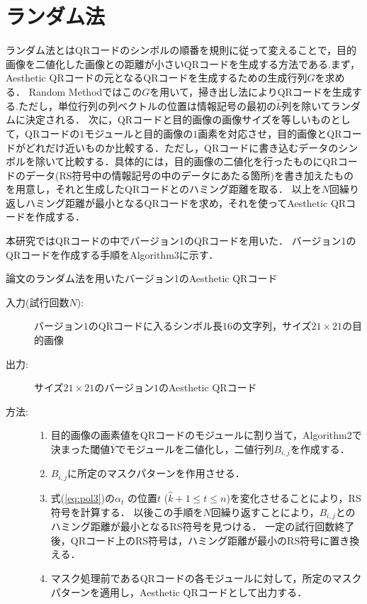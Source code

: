 \documentclass{thesis}
\begin{document}
\newpage
\section{ランダム法}

ランダム法とはQRコードのシンボルの順番を規則に従って変えることで，目的画像を二値化した画像との距離が小さいQRコードを生成する方法である.まず，Aesthetic QRコードの元となるQRコードを生成するための生成行列$G$を求める．
Random Methodではこの$G$を用いて，掃き出し法によりQRコードを生成する.ただし，単位行列の列ベクトルの位置は情報記号の最初の$\hat{k}$列を除いてランダムに決定される．
次に，QRコードと目的画像の画像サイズを等しいものとして，QRコードの$1$モジュールと目的画像の$1$画素を対応させ，目的画像とQRコードがどれだけ近いものか比較する．ただし，QRコードに書き込むデータのシンボルを除いて比較する．具体的には，目的画像の二値化を行ったものにQRコードのデータ(RS符号中の情報記号の中のデータにあたる箇所)を書き加えたものを用意し，それと生成したQRコードとのハミング距離を取る．
以上を$N$回繰り返しハミング距離が最小となるQRコードを求め，それを使ってAesthetic QRコードを作成する．

本研究ではQRコードの中でバージョン1のQRコードを用いた．
バージョン1のQRコードを作成する手順をAlgorithm$3$に示す．

\begin{algorithm}                      
\caption{論文\cite{KURI}のランダム法を用いたバージョン1のAesthetic QRコード}         
\label{alg:alg3} 
\begin{description}
\item[入力(試行回数$N$):] バージョン$1$のQRコードに入るシンボル長$16$の文字列，サイズ$21 \times 21$の目的画像
\item[出力:] サイズ$21 \times 21$のバージョン$1$のAesthetic QRコード
\item[方法:]
\begin{enumerate}
\item
目的画像の画素値をQRコードのモジュールに割り当て，Algorithm2で決まった閾値$\overline{Y}$でモジュールを二値化し，二値行列$B_{i,j}$を作成する．
\item
$B_{i,j}$に所定のマスクパターンを作用させる．
\item
式(\ref{eq:pol3})の$\alpha_{t}$ の位置$t$ ($\hat{k} + 1 \leq t \leq n $)を変化させることにより，RS符号を計算する．
以後この手順を$N$回繰り返すことにより，$B_{i,j}$とのハミング距離が最小となるRS符号を見つける．
一定の試行回数終了後，QRコード上のRS符号は，ハミング距離が最小のRS符号に置き換える．
\item
マスク処理前であるQRコードの各モジュールに対して，所定のマスクパターンを適用し，Aesthetic QRコードとして出力する．
\end{enumerate}
\end{description}
\end{algorithm} 
\end{document}
